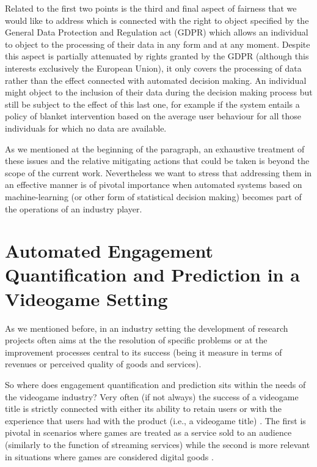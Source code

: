 Related to the first two points is the third and final aspect of fairness that we would like to address which is connected with the right to object specified by the General Data Protection and Regulation act (GDPR) \cite{EUdataregulations2018} which allows an individual to object to the processing of their data in any form and at any moment. Despite this aspect is partially attenuated by rights granted by the GDPR (although this interests exclusively the European Union), it only covers the processing of data rather than the effect connected with automated decision making. An individual might object to the inclusion of their data during the decision making process but still be subject to the effect of this last one, for example if the system entails a policy of blanket intervention based on the average user behaviour for all those individuals for which no data are available.

As we mentioned at the beginning of the paragraph, an exhaustive treatment of these issues and the relative mitigating actions that could be taken is beyond the scope of the current work. Nevertheless we want to stress that addressing them in an effective manner is of pivotal importance when automated systems based on machine-learning (or other form of statistical decision making) becomes part of the operations of an industry player.

\section{Automated Engagement Quantification and Prediction in a Videogame Setting}
\label{industry_needs}
As we mentioned before, in an industry setting the development of research projects often aims at the the resolution of specific problems or at the improvement processes central to its success (being it measure in terms of revenues or perceived quality of goods and services). 

So where does engagement quantification and prediction sits within the needs of the videogame industry? Very often (if not always) the success of a videogame title is strictly connected with either its ability to retain users or with the experience that users had with the product (i.e., a videogame title) \cite{amit2001value, alomari2016mobile}. The first is pivotal in scenarios where games are treated as a service sold to an audience (similarly to the function of streaming services) while the second is more relevant in situations where games are considered digital goods \cite{amit2001value, alomari2016mobile}. 

